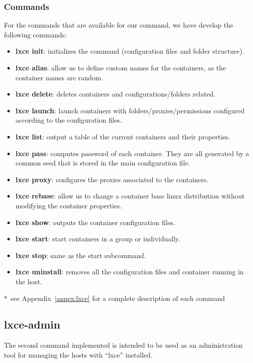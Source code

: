 \subsubsection{Commands}
For the commands that are available for our command, we have develop the following commands:
\begin{itemize}
	\item{\textbf{lxce init}: initializes the command (configuration files and folder structure).}
	\item{\textbf{lxce alias}: allow us to define custom names for the containers, as the container names are random.}
	\item{\textbf{lxce delete}: deletes containers and configurations/folders related.}
	\item{\textbf{lxce launch}: launch containers with folders/proxies/permissions configured according to the configuration files.                               }
	\item{\textbf{lxce list}: output a table of the current containers and their properties.}
	\item{\textbf{lxce pass}: computes password of each container. They are all generated by a common seed that is stored in the main configuration file.}
	\item{\textbf{lxce proxy}: configures the proxies associated to the containers.}
	\item{\textbf{lxce rebase}: allow us to change a container base linux distribution without modifying the container properties.}
	\item{\textbf{lxce show}: outputs the container configuration files.}
	\item{\textbf{lxce start}: start containers in a group or individually.}
	\item{\textbf{lxce stop}: same as the start subcommand.                              }
	\item{\textbf{lxce uninstall}: removes all the configuration files and container running in the host. }
\end{itemize}
*~see Appendix~\ref{annex:lxce} for a complete description of each command

\newpage
\subsection{lxce-admin}
The second command implemented is intended to be used as an administration tool for managing the hosts with ``lxce'' installed.  


